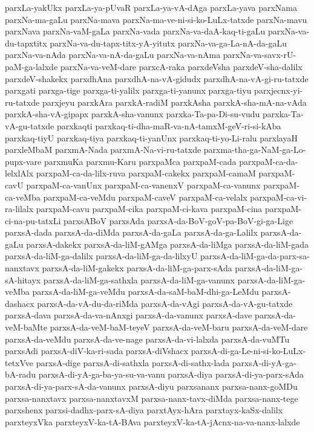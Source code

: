 {parxLa-yakUkx
parxLa-ya-pUvaR
parxLa-ya-vA-dAga
parxLa-yava
parxNama
parxNa-ma-gaLu
parxNa-mava
parxNa-ma-ve-ni-si-ko-LuLx-tatxde
parxNa-mavu
parxNava
parxNa-vaM-gaLa
parxNa-vada
parxNa-va-daA-kaq-ti-gaLu
parxNa-va-du-tapxtitx
parxNa-va-du-tapx-titx-yA-yitutx
parxNa-va-ga-La-nA-da-gaLu
parxNa-va-nAda
parxNa-va-nA-da-gaLu
parxNa-va-nAma
parxNa-va-savx-rU-paM-ga-lalxde
parxNa-va-veM-dare
parxcA-raka
parxdeVsha
parxdeV-sha-dalilx
parxdeV-shakekx
parxdhAna
parxdhA-na-vA-gidudx
parxdhA-na-vA-gi-ru-tatxde
parxgati
parxga-tige
parxga-ti-yalilx
parxga-ti-yanunx
parxga-tiyu
parxjecnx-yi-ru-tatxde
parxjeyu
parxkAra
parxkA-radiM
parxkAsha
parxkA-sha-mA-na-vAda
parxkA-sha-vA-gipapx
parxkA-sha-vanunx
parxka-Ta-pa-Di-su-vudu
parxka-Ta-vA-gu-tatxde
parxkaqti
parxkaq-ti-dha-maR-va-nA-tamxM-geV-ri-si-kAba
parxkaq-tiyU
parxkaq-tiya
parxkaq-ti-yanUnx
parxkaq-ti-yo-Li-ralu
parxlayaH
parxleMbaM
parxmA-Nada
parxmA-Na-vi-ru-tatxde
parxma-tha-ga-NaM-ga-Lo-pupx-vare
parxmuKa
parxmu-Karu
parxpaMca
parxpaM-cada
parxpaM-ca-da-lelxlAlx
parxpaM-ca-da-lilx-ruva
parxpaM-cakekx
parxpaM-camaM
parxpaM-cavU
parxpaM-ca-vanUnx
parxpaM-ca-vanenxV
parxpaM-ca-vanunx
parxpaM-ca-veMba
parxpaM-ca-veMdu
parxpaM-caveV
parxpaM-ca-velalx
parxpaM-ca-vi-ra-lilalx
parxpaM-cavu
parxpaM-cika
parxpaM-ci-kava
parxpaM-cina
parxpaM-ci-na-pu-tatxLi
parxsABoV
parxsAda
parxsA-da-BoV-goV-pa-BoV-gi-ga-Lige
parxsA-dada
parxsA-da-diMda
parxsA-da-gaLa
parxsA-da-ga-Lalilx
parxsA-da-gaLu
parxsA-dakekx
parxsA-da-liM-gAMga
parxsA-da-liMga
parxsA-da-liM-gada
parxsA-da-liM-ga-dalilx
parxsA-da-liM-ga-da-lilxyU
parxsA-da-liM-ga-da-parx-sa-nanxtavx
parxsA-da-liM-gakekx
parxsA-da-liM-ga-parx-sAda
parxsA-da-liM-ga-sA-hitayx
parxsA-da-liM-ga-sathxla
parxsA-da-liM-ga-vanunx
parxsA-da-liM-ga-veMba
parxsA-da-liM-ga-veMdu
parxsA-da-saM-baM-dhi-ga-LeMdu
parxsA-dashacx
parxsA-da-vA-du-da-riMda
parxsA-da-vAgi
parxsA-da-vA-gu-tatxde
parxsA-dava
parxsA-da-va-nAnxgi
parxsA-da-vanunx
parxsA-dave
parxsA-da-veM-baMte
parxsA-da-veM-baM-teyeV
parxsA-da-veM-baru
parxsA-da-veM-dare
parxsA-da-veMdu
parxsA-da-ve-nage
parxsA-da-vi-lalxda
parxsA-da-vuMTu
parxsAdi
parxsA-diV-ka-ri-sada
parxsA-diVshacx
parxsA-di-ga-Le-ni-si-ko-LuLx-tetxVve
parxsA-dige
parxsA-di-sathxla
parxsA-di-sathx-lada
parxsA-di-yA-ga-bA-radu
parxsA-di-yA-ga-ba-ya-su-va-vanu
parxsA-diya
parxsA-di-ya-parx-sAda
parxsA-di-ya-parx-sA-da-vanunx
parxsA-diyu
parxsananx
parxsa-nanx-goMDu
parxsa-nanxtavx
parxsa-nanxtavxM
parxsa-nanx-tavx-diMda
parxsa-nanx-tege
parxshenx
parxsi-dadhx-parx-sA-diya
parxtAyx-hAra
parxtayx-kaSx-dalilx
parxteyxVka
parxteyxV-ka-tA-BAva
parxteyxV-ka-tA-jAcnx-na-va-nanx-lalxde
}
